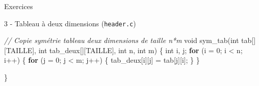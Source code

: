 \documentclass[
  10pt,
  french,
  ignorenonframetext,
  aspectratio=169,
]{beamer}
\newenvironment{Shaded}{}{}
\newcommand{\CommentTok}[1]{\textcolor[rgb]{0.38,0.63,0.69}{\textit{#1}}}
\newcommand{\ControlFlowTok}[1]{\textcolor[rgb]{0.00,0.44,0.13}{\textbf{#1}}}
\newcommand{\DataTypeTok}[1]{\textcolor[rgb]{0.56,0.13,0.00}{#1}}
\newcommand{\DecValTok}[1]{\textcolor[rgb]{0.25,0.63,0.44}{#1}}
\newcommand{\NormalTok}[1]{#1}
\newcommand{\OperatorTok}[1]{\textcolor[rgb]{0.40,0.40,0.40}{#1}}
\begin{document}
\begin{frame}[fragile]{Exercices}
\protect\hypertarget{exercices-9}{}
\begin{block}{3 - Tableau à deux dimensions (\texttt{header.c})}
\protect\hypertarget{tableau-uxe0-deux-dimensions-header.c-2}{}
\begin{Shaded}
\begin{Highlighting}[]
\CommentTok{// Copie symétrie tableau deux dimensions de taille n*m}
\DataTypeTok{void}\NormalTok{ sym\_tab}\OperatorTok{(}\DataTypeTok{int}\NormalTok{ tab}\OperatorTok{[][}\NormalTok{TAILLE}\OperatorTok{],} \DataTypeTok{int}\NormalTok{ tab\_deux}\OperatorTok{[][}\NormalTok{TAILLE}\OperatorTok{],} \DataTypeTok{int}\NormalTok{ n}\OperatorTok{,} \DataTypeTok{int}\NormalTok{ m}\OperatorTok{)} \OperatorTok{\{}
    \DataTypeTok{int}\NormalTok{ i}\OperatorTok{,}\NormalTok{ j}\OperatorTok{;}
    \ControlFlowTok{for} \OperatorTok{(}\NormalTok{i }\OperatorTok{=} \DecValTok{0}\OperatorTok{;}\NormalTok{ i }\OperatorTok{\textless{}}\NormalTok{ n}\OperatorTok{;}\NormalTok{ i}\OperatorTok{++)}
    \OperatorTok{\{}
        \ControlFlowTok{for} \OperatorTok{(}\NormalTok{j }\OperatorTok{=} \DecValTok{0}\OperatorTok{;}\NormalTok{ j }\OperatorTok{\textless{}}\NormalTok{ m}\OperatorTok{;}\NormalTok{ j}\OperatorTok{++)}
        \OperatorTok{\{}
\NormalTok{            tab\_deux}\OperatorTok{[}\NormalTok{i}\OperatorTok{][}\NormalTok{j}\OperatorTok{]} \OperatorTok{=}\NormalTok{ tab}\OperatorTok{[}\NormalTok{j}\OperatorTok{][}\NormalTok{i}\OperatorTok{];}
        \OperatorTok{\}}
    \OperatorTok{\}}

\OperatorTok{\}}
\end{Highlighting}
\end{Shaded}
\end{block}
\end{frame}
\end{document}
